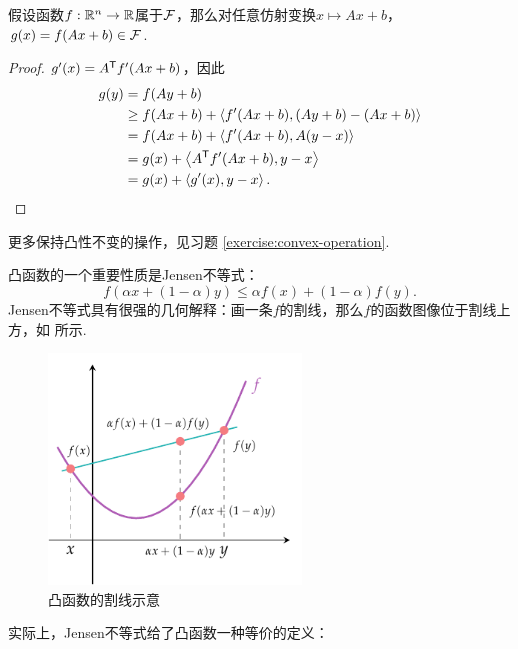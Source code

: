 \begin{proposition}\label{prop:affine-transformation}
假设函数$f:\mathbb{R}^n\to\mathbb{R}$属于$\mathcal F$，那么对任意仿射变换$x\mapsto Ax+b$，$g(x)=f(Ax+b)\in\mathcal F$.
\end{proposition}
\begin{proof}
    $g'(x)=A^{\mathsf{T}} f'(Ax+b)$，因此
    \begin{align*}
        g(y)&=f(Ay+b)\\
        &\geq f(Ax+b)+\left\langle{f'(Ax+b)},{(Ay+b)-(Ax+b)}\right\rangle\\
        &=f(Ax+b)+\left\langle{f'(Ax+b)},{A(y-x)}\right\rangle\\
        &=g(x)+\left\langle{A^{\mathsf{T}}f'(Ax+b)},{y-x}\right\rangle\\
        &=g(x)+\left\langle{g'(x)},{y-x}\right\rangle.
    \end{align*}
\end{proof}

更多保持凸性不变的操作，见习题 \ref{exercise:convex-operation}.

凸函数的一个重要性质是Jensen不等式：
\begin{equation}
    f(\alpha x+(1-\alpha) y)\leq \alpha f(x)+(1-\alpha) f(y). \label{eq:Jensen}
\end{equation}
Jensen不等式具有很强的几何解释：画一条$f$的割线，那么$f$的函数图像位于割线上方，如 所示. 

\begin{figure}[ht]
    \centering
    \includegraphics[width=0.6\textwidth]{figures/convex-anlaysis/convex-Jensen.pdf}
    \caption{凸函数的割线示意}
    \label{fig:convex-Jensen}
\end{figure}

实际上，Jensen不等式给了凸函数一种等价的定义：

